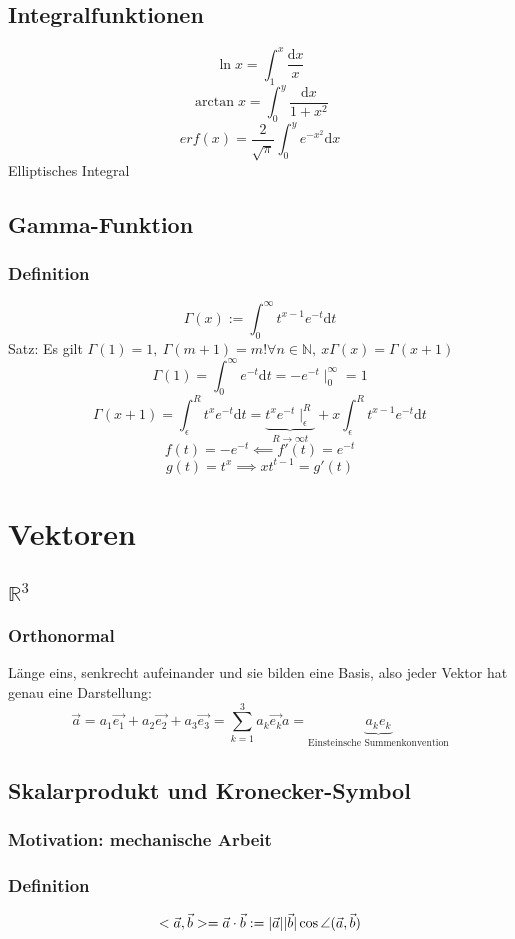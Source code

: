 \documentclass[a4paper]{scrartcl}
\DeclarePairedDelimiter\abs{\lvert}{\rvert}%
\DeclareMathOperator{\Forall}{\forall}
\begin{document}
\subsection{Integralfunktionen}
\label{sec-11-6}
\[\ln{x} = \int_1^x \frac{\mathrm{d}x}{x}\]
\[\arctan{x} = \int_0^y \frac{\mathrm{d}x}{1+x^2}\]
\[erf(x) = \frac{2}{\sqrt{\pi}}\int_0^y e^{-x^2}\mathrm{d}x\]
Elliptisches Integral
\subsection{Gamma-Funktion}
\label{sec-11-7}
\subsubsection{Definition}
\label{sec-11-7-1}
\[\Gamma(x):=\int_0^\infty t^{x-1}e^{-t}\mathrm{d}t\]
Satz: Es gilt $\Gamma(1) = 1,~\Gamma(m+1) = m! \Forall n\in\mathbb{N},~x\Gamma(x) = \Gamma(x+1)$
\[\Gamma(1)=\int_0^\infty e^{-t}\mathrm{d}t=-e^{-t}\mid_0^\infty = 1\]
\[\Gamma(x+1) = \int_\epsilon^R t^x e^{-t}\mathrm{d}t = \underbrace{t^x e^{-t}\mid_\epsilon^R}_{R\to\infty t} + x\int_\epsilon^R t^{x-1}e^{-t}\mathrm{d}t\]
\[f(t) = -e^{-t} \impliedby f'(t)=e^{-t}\]
\[g(t) = t^x \implies xt^{t-1} = g'(t)\]
\section{Vektoren}
\label{sec-12}
\subsection{$\mathbb{R}^3$}
\label{sec-12-1}
\subsubsection{Orthonormal}
\label{sec-12-1-1}
Länge eins, senkrecht aufeinander und sie bilden eine Basis, also jeder Vektor hat genau eine Darstellung: \[\vec{a} = a_1 \vec{e_1} + a_2 \vec{e_2} + a_3 \vec{e_3} = \sum_{k=1}^3 a_k \vec{e_k}a = \underbrace{a_k e_k}_{\text{Einsteinsche Summenkonvention}}\]
\subsection{Skalarprodukt und Kronecker-Symbol}
\label{sec-12-2}
\subsubsection{Motivation: mechanische Arbeit}
\label{sec-12-2-1}
\subsubsection{Definition}
\label{sec-12-2-2}
\[<\vec{a},\vec{b}> = \vec{a}\cdot\vec{b} := \abs{\vec{a}}\abs{\vec{b}}\cos{\angle (\vec{a},\vec{b})}\]
\end{document}
